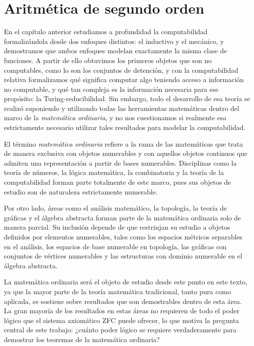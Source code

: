 \chapter{Aritmética de segundo orden}

En el capítulo anterior estudiamos a profundidad la computabilidad formalizándola desde dos enfoques distintos: el inductivo y el mecánico, y demostramos que ambos enfoques modelan exactamente la misma clase de funciones. A partir de ello obtuvimos los primeros objetos que son no computables, como lo son los conjuntos de detención, y con la computabilidad relativa formalizamos qué significa computar algo teniendo acceso a información no computable, y qué tan compleja es la información necesaria para ese propósito: la Turing-reducibilidad. Sin embargo, todo el desarrollo de esa teoría se realizó suponiendo y utilizando todas las herramientas matemáticas dentro del marco de la \emph{matemática ordinaria}, y no nos cuestionamos si realmente esa estrictamente necesario utilizar tales resultados para modelar la computabilidad.

El término \emph{matemática ordinaria} refiere a la rama de las matemáticas que trata de manera exclusiva con objetos numerables y con aquellos objetos continuos que admiten una representación a partir de bases numerables. Disciplinas como la teoría de números, la lógica matemática, la combinatoria y la teoría de la computabilidad forman parte totalmente de este marco, pues sus objetos de estudio son de naturaleza estrictamente numerable.

Por otro lado, áreas como el análisis matemático, la topología, la teoría de gráficas y el álgebra abstracta forman parte de la matemática ordinaria solo de manera parcial. Su inclusión depende de que restrinjan su estudio a objetos definidos por elementos numerables, tales como los espacios métricos separables en el análisis, los espacios de base numerable en topología, las gráficas con conjuntos de vértices numerables y las estructuras con dominio numerable en el álgebra abstracta.

La matemática ordinaria será el objeto de estudio desde este punto en este texto, ya que la mayor parte de la teoría matemática tradicional, tanto pura como aplicada, se sostiene sobre resultados que son demostrables dentro de esta área. La gran mayoría de los resultados en estas áreas no requieren de todo el poder lógico que el sistema axiomático ZFC puede ofrecer, lo que motiva la pregunta central de este trabajo: ¿cuánto poder lógico se requiere verdaderamente para demostrar los teoremas de la matemática ordinaria?

